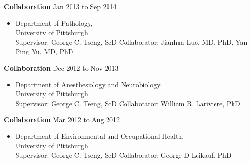 \documentclass[10pt]{article}
\newenvironment{innerlist}[1][\enskip\textbullet]%
        {\begin{itemize}[#1,leftmargin=*,parsep=0pt,itemsep=0pt,topsep=0pt,partopsep=0pt]}
        {\end{itemize}}
\begin{document}
\textbf{Collaboration} \hfill {Jan 2013 to Sep 2014}
\begin{innerlist}
\item[]   Department of Pathology,\\
        University of Pittsburgh\\
        Supervisor: George C. Tseng, ScD
        Collaborator: Jianhua Luo, MD, PhD, Yan Ping Yu, MD, PhD
\end{innerlist}

\textbf{Collaboration} \hfill {Dec 2012 to Nov 2013}
\begin{innerlist}
\item[]   Department of Anesthesiology and Neurobiology,\\
        University of Pittsburgh\\
        Supervisor: George C. Tseng, ScD
        Collaborator: William R. Lariviere, PhD
\end{innerlist}

\textbf{Collaboration} \hfill {Mar 2012 to Aug 2012}
\begin{innerlist}
\item[]   Department of Environmental and Occupational Health,\\
        University of Pittsburgh\\
        Supervisor: George C. Tseng, ScD
        Collaborator: George D Leikauf, PhD
\end{innerlist}
\end{document}

